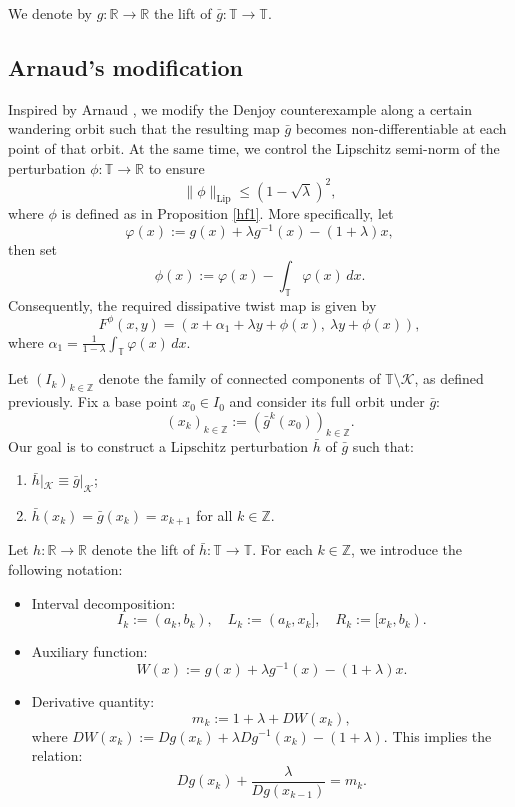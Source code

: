 \documentclass{amsart}
\newcommand{\R}{\mathbb{R}}
\newcommand{\T}{\mathbb{T}}
\theoremstyle{definition}
\begin{document}
We denote by $g:\mathbb{R} \to \mathbb{R}$ the lift of $\bar{g} : \mathbb{T} \to \mathbb{T}$.

\subsection{Arnaud's modification}



Inspired by Arnaud \cite{Ar11}, we modify the Denjoy counterexample along a certain wandering orbit such that the resulting map $\bar{g}$ becomes non-differentiable at each point of that orbit. At the same time, we control the Lipschitz semi-norm of the perturbation $\phi : \T \to \R$ to ensure
\[
\|\phi\|_{\mathrm{Lip}} \leq (1 - \sqrt{\lambda})^2,
\]
where $\phi$ is defined as in Proposition \ref{hf1}. More specifically, let
\[
\varphi(x) := g(x) + \lambda g^{-1}(x) - (1 + \lambda)x,
\]
then set
\[
\phi(x) := \varphi(x) - \int_{\T} \varphi(x)\, dx.
\]
Consequently, the required dissipative twist map is given by
\begin{equation}\label{Fphi}
F^{\phi}(x, y) = \left(x + \alpha_1 + \lambda y + \phi(x),\ \lambda y + \phi(x)\right),
\end{equation}
where $\alpha_1 = \frac{1}{1 - \lambda} \int_{\T} \varphi(x)\, dx$.

Let $(I_k)_{k \in \mathbb{Z}}$ denote the family of connected components of $\mathbb{T} \setminus \mathcal{K}$, as defined previously. Fix a base point $x_0 \in I_0$ and consider its full orbit under $\bar{g}$:
\[
(x_k)_{k \in \mathbb{Z}} := (\bar{g}^k(x_0))_{k \in \mathbb{Z}}.
\]
Our goal is to construct a Lipschitz perturbation $\bar{h}$ of $\bar{g}$ such that:
\begin{enumerate}
    \item $\bar{h}|_{\mathcal{K}} \equiv \bar{g}|_{\mathcal{K}}$;
    \item $\bar{h}(x_k) = \bar{g}(x_k) = x_{k+1}$ for all $k \in \mathbb{Z}$.
\end{enumerate}
Let $h : \R \to \R$ denote the lift of $\bar{h} : \T \to \T$. For each $k \in \mathbb{Z}$, we introduce the following notation:
\begin{itemize}
    \item Interval decomposition:
    \[
    I_k := (a_k, b_k), \quad L_k := (a_k, x_k], \quad R_k := [x_k, b_k).
    \]
    \item Auxiliary function:
    \[
    W(x) := g(x) + \lambda g^{-1}(x) - (1 + \lambda)x.
    \]
    \item Derivative quantity:
    \[
    m_k := 1 + \lambda + DW(x_k),
    \]
    where $DW(x_k) := Dg(x_k) + \lambda Dg^{-1}(x_k) - (1 + \lambda)$. This implies the relation:
    \[
    Dg(x_k) + \frac{\lambda}{Dg(x_{k-1})} = m_k.
    \]
\end{itemize}
\end{document}

